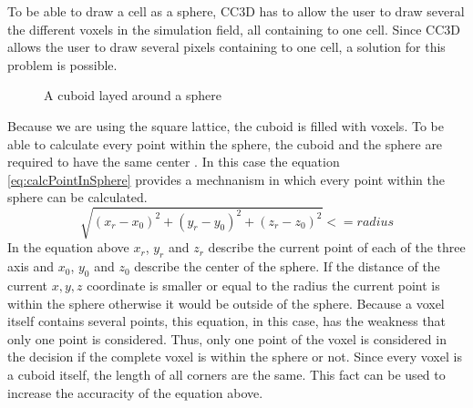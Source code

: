 To be able to draw a cell as a sphere, \ac{CC3D} has to allow the user to draw several the different voxels in the simulation field, all containing to one cell. Since \ac{CC3D} allows the user to draw several pixels containing to one cell, a solution for this problem is possible.


\begin{figure}
\begin{center}
\caption{A cuboid layed around a sphere}
\label{tikz:SphereInCube}
\end{center}
\end{figure}


Because we are using the square lattice, the cuboid is filled with voxels. To be able to calculate every point within the sphere, the cuboid and the sphere are required to have the same center \cite{REF}. In this case the equation \ref{eq:calcPointInSphere} provides a mechnanism in which every point within the sphere can be calculated.
\begin{equation}\label{eq:calcPointInSphere}
\sqrt{(x_{r}-x_{0})^2 + (y_{r}-y_{0})^2 + (z_{r}-z_{0})^2} <= radius
\end{equation}
In the equation above $x_{r}$, $y_{r}$ and $z_{r}$ describe the current point of each of the three axis and $x_{0}$, $y_{0}$ and $z_{0}$ describe the center of the sphere. If the distance of the current $x, y, z$ coordinate is smaller or equal to the radius the current point is within the sphere otherwise it would be outside of the sphere.
Because a voxel itself contains several points, this equation, in this case, has the weakness that only one point is considered. Thus, only one point of the voxel is considered in the decision if the complete voxel is within the sphere or not. Since every voxel is a cuboid itself, the length of all corners are the same. This fact can be used to increase the accuracity of the equation above.


